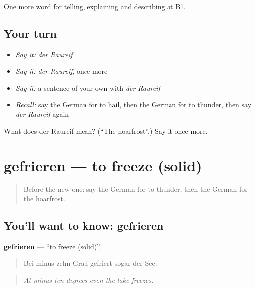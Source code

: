 \begin{grammarlens}[title={What you've built}]
One more word for telling, explaining and describing at B1.
\end{grammarlens}

\subsection*{Your turn}
\begin{itemize}
\raggedright
  \item \emph{Say it:} \emph{der Raureif}
  \item \emph{Say it:} \emph{der Raureif}, once more
  \item \emph{Say it:} a sentence of your own with \emph{der Raureif}
  \item \emph{Recall:} say the German for to hail, then the German for to thunder, then say \emph{der Raureif} again
\end{itemize}

\begin{tcolorbox}[breakable,colback=teal!4,colframe=teal!35!black,title={Before you move on}]
What does der Raureif mean? (\textquotedblleft{}The hoarfrost\textquotedblright{}.) Say it once more.
\end{tcolorbox}
\section[gefrieren]{gefrieren — to freeze (solid)}

\label{lesson:GE-C463-gefrieren}



\begin{quote}
Before the new one: say the German for to thunder, then the German for the hoarfrost.
\end{quote}

\subsection*{You'll want to know: gefrieren}
\textbf{gefrieren} — \textquotedblleft{}to freeze (solid)\textquotedblright{}.

\begin{quote}
Bei minus zehn Grad gefriert sogar der See.
\end{quote}

\begin{quote}
\emph{At minus ten degrees even the lake freezes.}
\end{quote}

